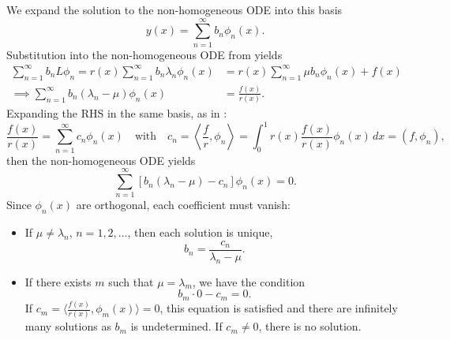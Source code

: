 We expand the solution to the non-homogeneous ODE into this basis
\[
	y(x) = \sum_{n=1}^{\infty} b_n \phi_n(x).
\]
Substitution into the non-homogeneous ODE from  yields
\begin{align*}
	\sum_{n=1}^{\infty} b_n L \phi_n = r(x) \sum_{n=1}^{\infty} b_n \lambda_n \phi_n(x) &= r(x) \sum_{n=1}^{\infty} \mu b_n \phi_n(x) + f(x) \\
	\implies \sum_{n=1}^{\infty} b_n (\lambda_n - \mu) \phi_n(x) &= \frac{f(x)}{r(x)}.
\end{align*}
Expanding the RHS in the same basis, as in :
\[
	\frac{f(x)}{r(x)} = \sum_{n=1}^{\infty} c_n \phi_n(x) \quad\text{with}\quad c_n = \left\langle \frac{f}{r}, \phi_n \right\rangle = \int_0^1 r(x) \frac{f(x)}{r(x)} \phi_n(x) \,dx = (f, \phi_n),
\]
then the non-homogeneous ODE yields
\[
	\sum_{n=1}^{\infty} [b_n(\lambda_n - \mu) - c_n] \phi_n(x) = 0.
\]
Since $\phi_n(x)$ are orthogonal, each coefficient must vanish:
\begin{itemize}
	\item If $\mu \neq \lambda_n$, $n = 1, 2, \ldots$, then each solution is unique,
	\[
		b_n = \frac{c_n}{\lambda_n - \mu}.
	\]
	\item If there exists $m$ such that $\mu = \lambda_m$, we have the condition
	\[
		b_m \cdot 0 - c_m = 0.
	\]
	If $c_m = \langle \frac{f(x)}{r(x)}, \phi_m(x)\rangle = 0$, this equation is satisfied and there are infinitely many solutions as $b_m$ is undetermined. If $c_m \neq 0$, there is no solution.
\end{itemize}

